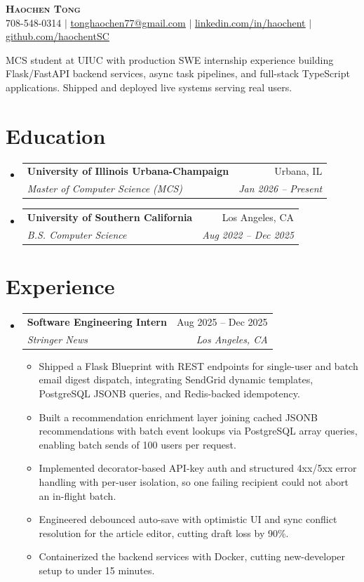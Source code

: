 \documentclass[letterpaper,11pt]{article}
\makeatletter
\newcommand{\resumeItem}[1]{
  \item\small{
    {#1 \vspace{-2pt}}
  }
}
\newcommand{\resumeSubheading}[4]{
  \vspace{-2pt}\item
    \begin{tabular*}{0.97\textwidth}[t]{l@{\extracolsep{\fill}}r}
      \textbf{#1} & #2 \\
      \textit{\small#3} & \textit{\small #4} \\
    \end{tabular*}\vspace{-7pt}
}
\newcommand{\resumeSubHeadingListStart}{\begin{itemize}[leftmargin=0.15in, label={}]}
\newcommand{\resumeSubHeadingListEnd}{\end{itemize}}
\newcommand{\resumeItemListStart}{\begin{itemize}}
\newcommand{\resumeItemListEnd}{\end{itemize}\vspace{-5pt}}
\makeatother
\begin{document}
\begin{center}
    \textbf{\Huge \scshape Haochen Tong} \\ \vspace{1pt}
    \small 708-548-0314 $|$ \href{mailto:tonghaochen77@gmail.com}{\underline{tonghaochen77@gmail.com}} $|$ \href{https://linkedin.com/in/haochent}{\underline{linkedin.com/in/haochent}} $|$ \href{https://github.com/haochentSC}{\underline{github.com/haochentSC}}
\end{center}

\vspace{-6pt}
\small MCS student at UIUC with production SWE internship experience building Flask/FastAPI backend services, async task pipelines, and full-stack TypeScript applications. Shipped and deployed live systems serving real users.
\vspace{2pt}

\section{Education}
  \resumeSubHeadingListStart
    \resumeSubheading
      {University of Illinois Urbana-Champaign}{Urbana, IL}
      {Master of Computer Science (MCS)}{Jan 2026 -- Present}
    \resumeSubheading
      {University of Southern California}{Los Angeles, CA}
      {B.S. Computer Science}{Aug 2022 -- Dec 2025}
  \resumeSubHeadingListEnd

\section{Experience}
  \resumeSubHeadingListStart
\resumeSubheading
  {Software Engineering Intern}{Aug 2025 -- Dec 2025}
  {Stringer News}{Los Angeles, CA}
  \resumeItemListStart
    \resumeItem{Shipped a Flask Blueprint with REST endpoints for single-user and batch email digest dispatch, integrating SendGrid dynamic templates, PostgreSQL JSONB queries, and Redis-backed idempotency.}
    \resumeItem{Built a recommendation enrichment layer joining cached JSONB recommendations with batch event lookups via PostgreSQL array queries, enabling batch sends of 100 users per request.}
    \resumeItem{Implemented decorator-based API-key auth and structured 4xx/5xx error handling with per-user isolation, so one failing recipient could not abort an in-flight batch.}
    \resumeItem{Engineered debounced auto-save with optimistic UI and sync conflict resolution for the article editor, cutting draft loss by 90\%.}
    \resumeItem{Containerized the backend services with Docker, cutting new-developer setup to under 15 minutes.}
  \resumeItemListEnd
  \resumeSubHeadingListEnd
\end{document}
